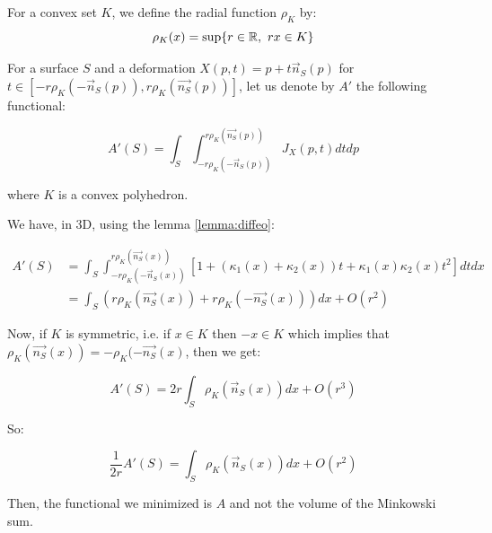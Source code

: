 \begin{definition}
    For a convex set $ K $, we define the radial function $ \rho_K $ by:
    $$ \rho_K(x) = \sup \{ r \in \mathbb{R},~rx \in K \} $$
\end{definition}

For a surface $ S $ and a deformation $ X(p, t) = p + t \vec{n}_S(p) $ for $ t \in
[-r \rho_K(-\vec{n}_S(p)), r \rho_K(\vec{n_S}(p)) ] $, let us denote by $ A' $
the following functional:

$$ A'(S) = \int_S \int_{-r \rho_K(-\vec{n}_S(p))}^{r \rho_K(\vec{n_S}(p))}
J_X(p, t) dt dp $$

where $ K $ is a convex polyhedron.

We have, in 3D, using the lemma \ref{lemma:diffeo}:

\begin{align*}
    A'(S) &= \int_S \int_{-r \rho_K(-\vec{n}_S(x))}^{r \rho_K(\vec{n_S}(x))}
    \left[ 1 + (\kappa_1(x) + \kappa_2(x)) t + \kappa_1(x) \kappa_2(x) t^2
    \right] dt dx \\
    &= \int_S (r \rho_K(\vec{n_S}(x)) + r \rho_K(-\vec{n_S}(x))) dx + O(r^2)
\end{align*}

Now, if $ K $ is symmetric, i.e. if $ x \in K $ then $ -x \in K $ which implies
that $ \rho_K(\vec{n_S}(x)) = -\rho_K(-\vec{n_S}(x) $, then we get:

\begin{equation}
    A'(S) = 2r \int_S \rho_K(\vec{n}_S(x)) dx + O(r^3)
\end{equation}

So:

$$ \frac{1}{2r} A'(S) = \int_S \rho_K(\vec{n}_S(x)) dx + O(r^2) $$

Then, the functional we minimized is $ A $ and not the volume of the Minkowski
sum.


